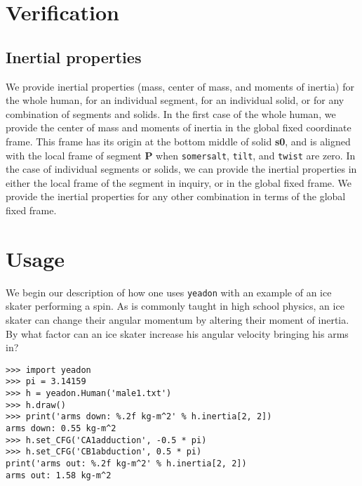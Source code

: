 \documentclass[10pt]{article}
\begin{document}
\section*{Verification}

\subsection*{Inertial properties}

We provide inertial properties (mass, center of mass, and moments of inertia)
for the whole human, for an individual segment, for an individual solid, or for
any combination of segments and solids. In the first case of the whole human,
 we provide the center of mass and moments of inertia in the global fixed coordinate frame. This frame has its
 origin at the bottom middle of solid \textbf{s0}, and is aligned with the
local frame of segment \textbf{P} when \verb+somersalt+, \verb+tilt+, and
\verb+twist+ are zero.
In the case of individual segments or solids, we can provide the inertial
properties in either the local frame of the segment in inquiry, or in the
global fixed frame. We provide the inertial properties for any other
combination in terms of the global fixed frame.





\section*{Usage}
\label{sec:usage}

We begin our description of how one uses \verb+yeadon+ with an example of an
ice skater performing a spin. As is commonly taught in high school physics, an
ice skater can change their angular momentum by altering their moment of
inertia. By what factor can an ice skater increase his angular velocity
bringing his arms in?

\begin{verbatim}
>>> import yeadon
>>> pi = 3.14159
>>> h = yeadon.Human('male1.txt')
>>> h.draw()
>>> print('arms down: %.2f kg-m^2' % h.inertia[2, 2])
arms down: 0.55 kg-m^2
>>> h.set_CFG('CA1adduction', -0.5 * pi)
>>> h.set_CFG('CB1abduction', 0.5 * pi)
print('arms out: %.2f kg-m^2' % h.inertia[2, 2])
arms out: 1.58 kg-m^2
\end{verbatim}
\end{document}
